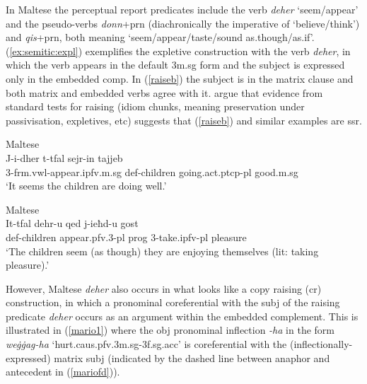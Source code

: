\documentclass[output=paper,hidelinks]{langscibook}
\begin{document}
In Maltese the perceptual report predicates include
the verb
{\em deher} `seem/appear' and the pseudo-verbs {\em donn}+{\sc prn} (diachronically the imperative
of `believe/think')  and  {\em qis}+{\sc prn}, both  meaning  `seem/appear/taste/sound
as.though/as.if'.    (\ref{ex:semitic:expl}) exemplifies the expletive construction with the verb  {\em deher}, in which the verb appears in the default {\sc 3m.sg} form and the subject is expressed only in the embedded {\sc comp}.  In (\ref{raiseb}) the subject is in the matrix clause and both matrix and embedded verbs agree with it.
\citet{CES:LFG14} argue that evidence from standard tests for raising (idiom chunks, meaning preservation under passivisation, expletives, etc)
suggests that (\ref{raiseb}) and similar examples are {\sc ssr}.







\ea
\label{ex:semitic:expl} Maltese \citep[191]{CES:LFG14} \\
\gll J-i-dher  t-tfal sejr-in tajjeb\\
3-{\sc frm.vwl}-appear.{\sc ipfv.m.sg} {\sc def-}children going.{\sc act.ptcp-pl} good.{\sc m.sg}\\
\glt `It seems  the children are doing well.'
\z




\ea
\label{raiseb}
Maltese  \citep[191]{CES:LFG14} \\
\gll It-tfal dehr-u qed j-ieħd-u gost\\
{\sc def-}children appear.{\sc pfv.3-pl}  {\sc prog} 3-take.{\sc ipfv-pl} pleasure\\
\glt `The children seem (as though) they are enjoying themselves (lit: taking
pleasure).'
\z



\newpage
 However, Maltese {\em deher} also occurs in what looks like a copy raising ({\sc cr})  construction, in which a pronominal coreferential with the  {\sc subj} of the  raising predicate {\em deher} occurs as an argument within  the embedded complement. This is illustrated in (\ref{mario1}) where the {\sc obj} pronominal inflection {\em -ha} in the form {\em we\.{g}\.{g}ag{\hwithstroke}-ha} `hurt.{\sc caus.pfv.3m.sg-3f.sg.acc}' is coreferential with the (inflectionally-expres\-sed)  matrix {\sc subj} (indicated by the dashed line between anaphor and antecedent in (\ref{mariofd})).
\end{document}
